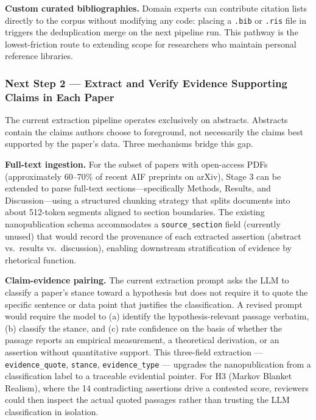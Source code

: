 \documentclass[
  english,
]{article}
\begin{document}
\textbf{Custom curated bibliographies.} Domain experts can contribute
citation lists directly to the corpus without modifying any code:
placing a \texttt{.bib} or \texttt{.ris} file in
 triggers the deduplication merge
on the next pipeline run. This pathway is the lowest-friction route to
extending scope for researchers who maintain personal reference
libraries.

\subsubsection{Next Step 2 --- Extract and Verify Evidence Supporting
Claims in Each
Paper}\label{next-step-2-extract-and-verify-evidence-supporting-claims-in-each-paper}

The current extraction pipeline operates exclusively on abstracts.
Abstracts contain the claims authors choose to foreground, not
necessarily the claims best supported by the paper's data. Three
mechanisms bridge this gap.

\textbf{Full-text ingestion.} For the subset of papers with open-access
PDFs (approximately 60--70\% of recent AIF preprints on arXiv), Stage 3
can be extended to parse full-text sections---specifically Methods,
Results, and Discussion---using a structured chunking strategy that
splits documents into about 512-token segments aligned to
section boundaries. The existing nanopublication schema accommodates a
\texttt{source\_section} field (currently unused) that would record the
provenance of each extracted assertion (abstract vs.~results
vs.~discussion), enabling downstream stratification of evidence by
rhetorical function.

\textbf{Claim-evidence pairing.} The current extraction prompt asks the
LLM to classify a paper's stance toward a hypothesis but does not
require it to quote the specific sentence or data point that justifies
the classification. A revised prompt would require the model to (a)
identify the hypothesis-relevant passage verbatim, (b) classify the
stance, and (c) rate confidence on the basis of whether the passage
reports an empirical measurement, a theoretical derivation, or an
assertion without quantitative support. This three-field extraction ---
\texttt{evidence\_quote}, \texttt{stance}, \texttt{evidence\_type} ---
upgrades the nanopublication from a classification label to a traceable
evidential pointer. For H3 (Markov Blanket Realism), where the 14
contradicting assertions drive a contested score, reviewers could then
inspect the actual quoted passages rather than trusting the LLM
classification in isolation.
\end{document}

